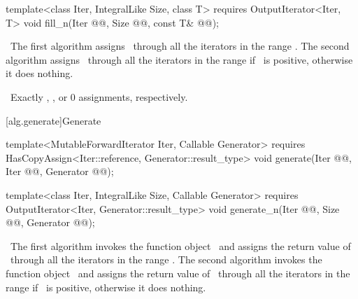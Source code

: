 \documentclass[american,twoside]{book}
\begin{document}
\begin{paras}
\begin{itemdecl}
template<class Iter, IntegralLike Size, class T>
  requires OutputIterator<Iter, T>
  void fill_n(Iter @@, Size @@, const T& @@);
\end{itemdecl}\color{black}

\begin{itemdescr}
\pnum
{} 

\pnum
\effects\ 
The first algorithm assigns \ through all the iterators in the range
\range{\farg{first}}{\farg{last}}. The second algorithm assigns \farg{value}\
through all the iterators in the range 
if \farg{n}\ is positive, otherwise it does nothing.

\textcolor{black}{\pnum}
\complexity\ 
Exactly
,
, or 0 assignments, respectively.
\end{itemdescr}

[alg.generate]{Generate}

%
%
\color{addclr}\begin{itemdecl}
template<MutableForwardIterator Iter, Callable Generator>
  requires HasCopyAssign<Iter::reference, Generator::result_type>
  void generate(Iter @@, Iter @@,
                Generator @\farg{gen}@);

template<class Iter, IntegralLike Size, Callable Generator>
  requires OutputIterator<Iter, Generator::result_type>
  void generate_n(Iter @@, Size @@, Generator @@);
\end{itemdecl}\color{black}

\begin{itemdescr}
\pnum
\effects\ 
The first algorithm invokes the function object \ and assigns the return
value of \ through all the iterators in the range
. The second algorithm invokes the function object
\ and assigns the return value of \farg{gen}\ through all the iterators in
the range \range{\farg{first}}{\farg{first} + \farg{n}} if \farg{n}\ is positive,
otherwise it does nothing.


\end{itemdescr}
\end{paras}
\end{document}
